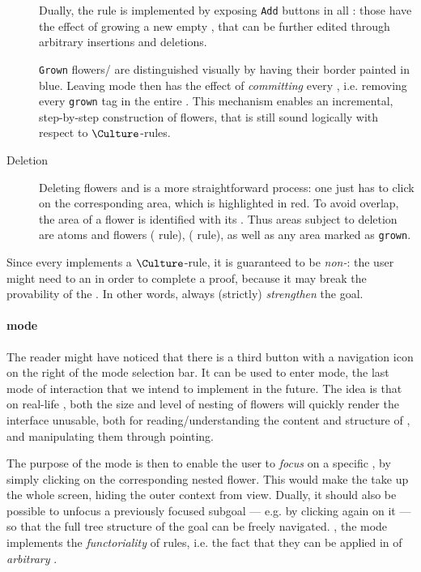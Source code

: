 \begin{scope}
\begin{description}
  Dually, the  rule is implemented by exposing \texttt{Add} buttons in
  all  : those have the effect of growing a new empty ,
  that can be further edited through arbitrary insertions and deletions.

  \texttt{Grown} flowers/ are distinguished visually by having their
  border painted in blue. Leaving  mode then has the effect of
  \emph{committing} every  , i.e. removing every \texttt{grown}
  tag in the entire . This mechanism enables an incremental,
  step-by-step construction of flowers, that is still sound logically with
  respect to $\Culture$-rules.

  \item[Deletion] Deleting flowers and  is a more straightforward
  process: one just has to click on the corresponding area, which is highlighted
  in red. To avoid overlap, the area of a flower is identified with its
  . Thus areas subject to deletion are  atoms and
  flowers ( rule),   ( rule), as well
  as any area marked as \texttt{grown}.
\end{description}

Since every   implements a $\Culture$-rule, it is guaranteed
to be \emph{non-}: the user might need to  an 
 in order to complete a proof, because it may break the provability
of the . In other words,   always (strictly)
\emph{strengthen} the goal.

\paragraph{ mode}

The reader might have noticed that there is a third button with a navigation
icon on the right of the mode selection bar. It can be used to enter
 mode, the last mode of interaction that we intend to implement
in the future. The idea is that on real-life , both the size and level
of nesting of flowers will quickly render the interface unusable, both for
reading/understanding the content and structure of , and manipulating
them through pointing.

The purpose of the  mode is then to enable the user to
\emph{focus} on a specific , by simply clicking on the corresponding
nested flower. This would make the  take up the whole screen, hiding
the outer context from view. Dually, it should also be possible to unfocus a
previously focused subgoal --- e.g. by clicking again on it --- so that the full
tree structure of the goal can be freely navigated. ,
the  mode implements the \emph{functoriality} of rules, i.e. the
fact that they can be applied in  of \emph{arbitrary} .


\end{scope}
